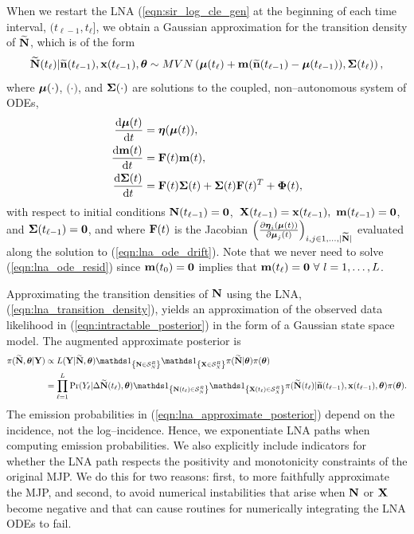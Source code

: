 When we restart the LNA (\ref{eqn:sir_log_cle_gen} at the beginning of each time interval, $ (t_{\ell-1},t_\ell] $, we obtain a Gaussian approximation for the transition density of $ \widetilde{\mathbf{N}} $, which is of the form
\begin{equation}
\label{eqn:lna_transition_density}
\widetilde{\mathbf{N}}(t_\ell)|\widetilde{\mathbf{n}}(t_{\ell-1}), \mathbf{x}(t_{\ell-1}),\boldsymbol{\theta} \sim MVN\left (\boldsymbol{\mu}(t_\ell) + \mathbf{m}(\widetilde{\mathbf{n}}(t_{\ell-1}) - \boldsymbol{\mu}(t_{\ell-1})), \boldsymbol{\Sigma}(t_\ell)\right ),
\end{equation}
where $ \boldsymbol{\mu}(\cdot) $, $ \bm(\cdot) $, and $ \boldsymbol{\Sigma}(\cdot) $ are solutions to the coupled, non--autonomous system of ODEs,
\begin{align}
\label{eqn:lna_ode_drift}
\frac{\mathrm{d}\boldsymbol{\mu}(t)}{\mathrm{d} t} &= \boldsymbol{\eta}(\boldsymbol{\mu}(t)),\\
\label{eqn:lna_ode_resid}
\frac{\mathrm{d}\mathbf{m}(t)}{\mathrm{d} t} &= \mathbf{F}(t)\mathbf{m}(t),\\
\label{eqn:lna_ode_diffusion}
\frac{\mathrm{d}\boldsymbol{\Sigma}(t)}{\mathrm{d} t} &= \mathbf{F}(t)\boldsymbol{\Sigma}(t) + \boldsymbol{\Sigma}(t)\mathbf{F}(t)^T + \boldsymbol{\Phi}(t),
\end{align}
with respect to initial conditions $ \mathbf{N}(t_{\ell-1}) = \boldsymbol{0} $,\ $ \mathbf{X}(t_{\ell-1}) = \mathbf{x}(t_{\ell-1}),\ \mathbf{m}(t_{\ell-1}) = \boldsymbol{0}$, and $ \boldsymbol{\Sigma}(t_{\ell-1}) = \boldsymbol{0} $, and where $ \mathbf{F}(t) $ is the Jacobian $ \left (\frac{\partial\boldsymbol{\eta}_i(\boldsymbol{\mu}(t))}{\partial\boldsymbol{\mu}_j(t)}\right )_{i,j\in{1,\dots,|\widetilde{\mathbf{N}}|}} $ evaluated along the solution to (\ref{eqn:lna_ode_drift}). Note that we never need to solve (\ref{eqn:lna_ode_resid}) since $ \mathbf{m}(t_{0}) = \boldsymbol{0} $ implies that $ \bm(t_\ell) = \bs{0}\ \forall\ l=1,\dots,L$. 

Approximating the transition densities of $ \mathbf{N} $ using the LNA, (\ref{eqn:lna_transition_density}), yields an approximation of the observed data likelihood in (\ref{eqn:intractable_posterior}) in the form of a Gaussian state space model. The augmented approximate posterior is
\begin{align}
\label{eqn:lna_approximate_posterior}
\pi(\bNtil,\btheta|\bY) &\propto L(\bY|\bNtil,\btheta)\ind{\bN\in\mcS_N^R}\ind{\bX\in\mcS_X^R}\pi(\bNtil|\btheta)\pi(\btheta) \nonumber\\
&= \prod_{\ell=1}^{L}\Pr(Y_\ell|\Delta\bNtil(t_\ell),\btheta)\ind{\bN(t_\ell)\in\mcS_N^R}\ind{\bX(t_\ell)\in\mcS_X^R}\pi(\bNtil(t_\ell)|\bntil(t_{\ell-1}),\bx(t_{\ell-1}),\btheta)\pi(\btheta).
\end{align}
The emission probabilities in (\ref{eqn:lna_approximate_posterior}) depend on the incidence, not the log--incidence. Hence, we exponentiate LNA paths when computing emission probabilities. We also explicitly include indicators for whether the LNA path respects the positivity and monotonicity constraints of the original MJP. We do this for two reasons: first, to more faithfully approximate the MJP, and second, to avoid numerical instabilities that arise when $ \mathbf{N} $ or $ \mathbf{X} $ become negative and that can cause routines for numerically integrating the LNA ODEs to fail. 


